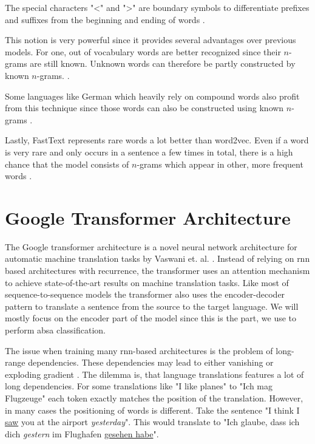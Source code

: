 The special characters "<" and ">" are boundary symbols to differentiate prefixes and suffixes from the beginning and ending of words \cite{Bojanowski2017}.
\medskip

This notion is very powerful since it provides several advantages over previous models. For one, out of vocabulary words are better recognized since their $n$-grams are still known. Unknown words can therefore be partly constructed by known $n$-grams. \cite{Bojanowski2017}. 
\medskip

Some languages like German which heavily rely on compound words also profit from this technique since those words can also be constructed using known $n$-grams \cite{Bojanowski2017}.
\medskip

Lastly, FastText represents rare words a lot better than word2vec. Even if a word is very rare and only occurs in a sentence a few times in total, there is a high chance that the model consists of $n$-grams which appear in other, more frequent words \cite{Bojanowski2017}.

\section{Google Transformer Architecture}

The Google transformer architecture is a novel neural network architecture for automatic machine translation tasks by Vaswani et. al. \cite{Vaswani2017d}. Instead of relying on \gls{rnn} based architectures with recurrence, the transformer uses an attention mechanism to achieve state-of-the-art results on machine translation tasks. Like most of sequence-to-sequence models the transformer also uses the encoder-decoder pattern to translate a sentence from the source to the target language. We will mostly focus on the encoder part of the model since this is the part, we use to perform \gls{absa} classification.
\medskip

The issue when training many \gls{rnn}-based architectures is the problem of long-range dependencies. These dependencies may lead to either vanishing or exploding gradient \cite{Hochreiter2009}. The dilemma is, that language translations features a lot of long dependencies. For some translations like "I like planes" to "Ich mag Flugzeuge" each token exactly matches the position of the translation. However, in many cases the positioning of words is different. Take the sentence "I think I \underline{saw} you at the airport \emph{yesterday}". This would translate to "Ich glaube, dass ich dich \emph{gestern} im Flughafen \underline{gesehen habe}".

